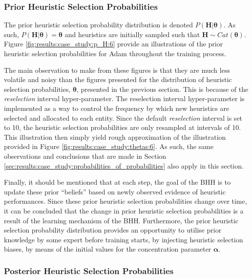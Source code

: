 \subsubsection{Prior Heuristic Selection Probabilities}\label{sec:results:case_study:priors}

The prior heuristic selection probability distribution is denoted $P(\boldsymbol{H} \vert \boldsymbol{\theta})$. As such, $P(\boldsymbol{H} \vert \boldsymbol{\theta}) = \boldsymbol{\theta}$ and heuristics are initially sampled such that $\boldsymbol{H} \sim Cat(\boldsymbol{\theta})$. Figure \ref{fig:results:case_study:p_H:6} provide an illustrations of the prior heuristic selection probabilities for \acs{Adam} throughout the training process.

The main observation to make from these figures is that they are much less volatile and noisy than the figures presented for the distribution of heuristic selection probabilities, $\boldsymbol{\theta}$, presented in the previous section. This is because of the \textit{reselection} interval hyper-parameter. The reselection interval hyper-parameter is implemented as a way to control the frequency by which new heuristics are selected and allocated to each entity. Since the default \textit{reselection} interval is set to 10, the heuristic selection probabilities are only resampled at intervals of 10. This illustration then simply yield rough approximation of the illustration provided in Figure \ref{fig:results:case_study:thetas:6}. As such, the same observations and conclusions that are made in Section \ref{sec:results:case_study:probabilities_of_probabilities} also apply in this section.

Finally, it should be mentioned that at each step, the goal of the \acs{BHH} is to update these prior ``beliefs'' based on newly observed evidence of heuristic performances. Since these prior heuristic selection probabilities change over time, it can be concluded that the change in prior heuristic selection probabilities is a result of the learning mechanism of the \acs{BHH}. Furthermore, the prior heuristic selection probability distribution provides an opportunity to utilise prior knowledge by some expert before training starts, by injecting heuristic selection biases, by means of the initial values for the concentration parameter $\boldsymbol{\alpha}$.

\subsubsection{Posterior Heuristic Selection Probabilities}\label{sec:results:case_study:posteriors}

